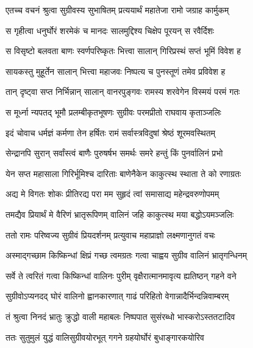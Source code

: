 
\twolineshloka
{एतच्च वचनं श्रुत्वा सुग्रीवस्य सुभाषितम्}
{प्रत्ययार्थं महातेजा रामो जग्राह कार्मुकम्} %

\twolineshloka
{स गृहीत्वा धनुर्घोरं शरमेकं च मानदः}
{सालमुद्दिश्य चिक्षेप पूरयन् स रवैर्दिशः} %

\twolineshloka
{स विसृष्टो बलवता बाणः स्वर्णपरिष्कृतः}
{भित्त्वा सालान् गिरिप्रस्थं सप्तं भूमिं विवेश ह} %

\twolineshloka
{सायकस्तु मुहूर्तेन सालान् भित्त्वा महाजवः}
{निष्पत्य च पुनस्तूणं तमेव प्रविवेश ह} %

\twolineshloka
{तान् दृष्ट्वा सप्त निर्भिन्नान् सालान् वानरपुङ्गवः}
{रामस्य शरवेगेन विस्मयं परमं गतः} %

\twolineshloka
{स मूर्ध्ना न्यपतद् भूमौ प्रलम्बीकृतभूषणः}
{सुग्रीवः परमप्रीतो राघवाय कृताञ्जलिः} %

\twolineshloka
{इदं चोवाच धर्मज्ञं कर्मणा तेन हर्षितः}
{रामं सर्वास्त्रविदुषां श्रेष्ठं शूरमवस्थितम्} %

\twolineshloka
{सेन्द्रानपि सुरान् सर्वांस्त्वं बाणैः पुरुषर्षभ}
{समर्थः समरे हन्तुं किं पुनर्वालिनं प्रभो} %

\twolineshloka
{येन सप्त महासाला गिरिर्भूमिश्च दारिताः}
{बाणेनैकेन काकुत्स्थ स्थाता ते को रणाग्रतः} %

\twolineshloka
{अद्य मे विगतः शोकः प्रीतिरद्य परा मम}
{सुहृदं त्वां समासाद्य महेन्द्रवरुणोपमम्} %

\twolineshloka
{तमद्यैव प्रियार्थं मे वैरिणं भ्रातृरूपिणम्}
{वालिनं जहि काकुत्स्थ मया बद्धोऽयमञ्जलिः} %

\twolineshloka
{ततो रामः परिष्वज्य सुग्रीवं प्रियदर्शनम्}
{प्रत्युवाच महाप्राज्ञो लक्ष्मणानुगतं वचः} %

\twolineshloka
{अस्माद्गच्छाम किष्किन्धां क्षिप्रं गच्छ त्वमग्रतः}
{गत्वा चाह्वय सुग्रीव वालिनं भ्रातृगन्धिनम्} %

\twolineshloka
{सर्वे ते त्वरितं गत्वा किष्किन्धां वालिनः पुरीम्}
{वृक्षैरात्मानमावृत्य ह्यतिष्ठन् गहने वने} %

\twolineshloka
{सुग्रीवोऽप्यनदद् घोरं वालिनो ह्वानकारणात्}
{गाढं परिहितो वेगान्नादैर्भिन्दन्निवाम्बरम्} %

\twolineshloka
{तं श्रुत्वा निनदं भ्रातुः क्रुद्धो वाली महाबलः}
{निष्पपात सुसंरब्धो भास्करोऽस्ततटादिव} %

\twolineshloka
{ततः सुतुमुलं युद्धं वालिसुग्रीवयोरभूत्}
{गगने ग्रहयोर्घोरं बुधाङ्गारकयोरिव} %


